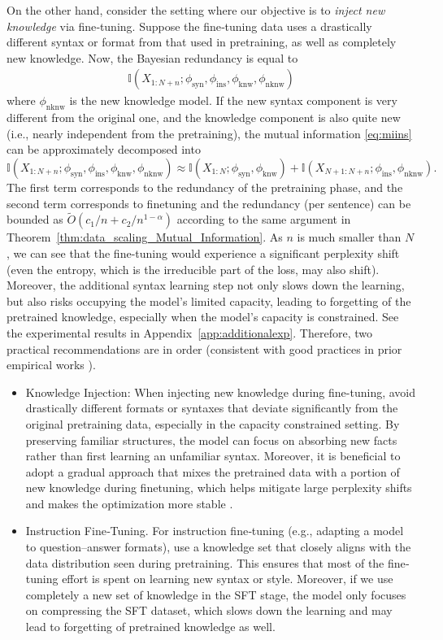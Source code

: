 \documentclass[11pt]{article}
\theoremstyle{plain}
\theoremstyle{definition}
\newcommand{\knwModel}{\phi_{\text{knw}}}
\newcommand{\knwModelNew}{\phi_{\text{nknw}}}
\newcommand{\synModel}{\phi_{\text{syn}}}
\newcommand{\instructionModel}{\phi_{\text{ins}}}
\begin{document}
On the other hand, consider the setting where our objective is to {\em inject 
new knowledge} via fine‐tuning.
Suppose the fine‐tuning data uses a drastically different syntax or format from that used in pretraining, as well as completely new knowledge.
Now, the Bayesian redundancy is equal to
\begin{align}
\mathbb{I}(X_{1:N+n}; \synModel, \instructionModel, \knwModel, \knwModelNew)
\label{eq:miins}
\end{align}
where $\knwModelNew$ is the new knowledge model.
If the new syntax component is very different from the original one,
and the knowledge component is also quite new (i.e.,
nearly independent from the pretraining), the mutual information
\eqref{eq:miins} can be approximately decomposed into 
$$
\mathbb{I}(X_{1:N+n}; \synModel, \instructionModel, \knwModel, \knwModelNew)
\approx
\mathbb{I}(X_{1:N}; \synModel,  \knwModel)
+\mathbb{I}(X_{N+1:N+n}; \instructionModel, \knwModelNew). 
$$
The first term corresponds to the redundancy of the pretraining phase,
and the second term corresponds to finetuning and the redundancy (per sentence) can be bounded
as $\widetilde{O}(c_1/n+c_2/n^{1-\alpha})$ according to the same argument
in Theorem~\ref{thm:data_scaling_Mutual_Information}. As $n$ is much smaller
than $N$, we can see that the fine-tuning would experience a significant perplexity shift (even the entropy, which is the irreducible part of the loss, may also shift).
Moreover, the additional syntax learning step not only slows down the learning, but also risks occupying the model's limited capacity, leading to forgetting of the pretrained knowledge, especially when the model's capacity is constrained.
See the experimental results in Appendix~\ref{app:additionalexp}.
Therefore, two practical recommendations are in order (consistent with good practices in prior empirical works \citep{zhang2025unveiling, grattafiori2024llama, yang2024qwen2}).

\begin{itemize}
\item Knowledge Injection: When injecting new knowledge during fine-tuning, avoid drastically different formats or syntaxes that deviate significantly from the original pretraining data, especially in the capacity constrained setting. By preserving familiar structures, the model can focus on absorbing new facts rather than first learning an unfamiliar syntax. Moreover, 
it is beneficial to adopt a gradual approach that mixes the pretrained data with a portion of new knowledge during finetuning, which
helps mitigate large perplexity shifts and makes the optimization more stable \citep{guptacontinual,ibrahimsimple}.

\item Instruction Fine‐Tuning. For instruction fine‐tuning (e.g., adapting a model to question–answer formats), use a knowledge set that closely aligns with the data distribution seen during pretraining. 
This ensures that most of the fine‐tuning effort is spent on learning new syntax or style. Moreover, if we use completely a new set of knowledge in the SFT stage, the model only focuses on compressing the SFT dataset, which slows down the learning and may lead to forgetting of pretrained knowledge as well.
\end{itemize}
\end{document}
